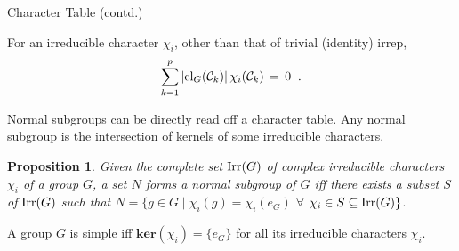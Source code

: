 \documentclass{beamer}
\newtheorem{proposition}{Proposition}
\begin{document}
\begin{frame}{Character Table (contd.)}
    \begin{corollary}
        For an irreducible character $\chi_i$, other than that of trivial (identity) irrep,
        \vspace{-0.75em}
        \begin{align*}
            \sum\limits_{k=1}^{p}\,\lvert\textup{cl}_G (\mathcal{C}_k)\rvert\,\chi_i(\mathcal{C}_k)\,=\,0 \;\;.
        \end{align*}
    \end{corollary}
    Normal subgroups can be directly read off a character table. Any normal subgroup is the intersection of kernels of some irreducible characters.
    \begin{proposition}
        Given the complete set $\textup{Irr}(G)$ of complex irreducible characters $\chi_i$ of a group $G$, a set $N$ forms a normal subgroup of $G$ iff there exists a subset $S$ of $\textup{Irr}(G)$ such that $N=\{g\in G\mid\chi_i(g)=\chi_i(e_G)$ $\forall$ $\chi_i\in S\subseteq\textup{Irr}(G)\}$.
    \end{proposition}
    \begin{corollary}
        A group $G$ is simple iff $\mathbf{ker}(\chi_i) = \{e_G\}$ for all its irreducible characters $\chi_i$.
    \end{corollary}
\end{frame}
\end{document}
